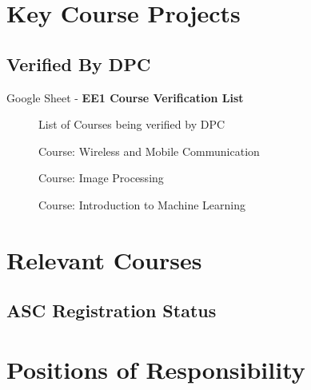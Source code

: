 \documentclass{article}
\begin{document}
\section{Key Course Projects}
	\subsection{Verified By DPC}
		Google Sheet - \textbf{EE1 Course Verification List}
		\begin{figure}[h]
			\caption{List of Courses being verified by DPC}
		\end{figure}
\newpage
		\begin{figure}[h]
			\caption{Course: Wireless and Mobile Communication}
		\end{figure}
		\begin{figure}[h]
			\caption{Course: Image Processing}
		\end{figure}
		\begin{figure}[h]
			\caption{Course: Introduction to Machine Learning}
		\end{figure}
\newpage
\section{Relevant Courses}
	\subsection{ASC Registration Status}
	\begin{figure}[h]
		\end{figure}
\newpage
\section{Positions of Responsibility}
\end{document}
